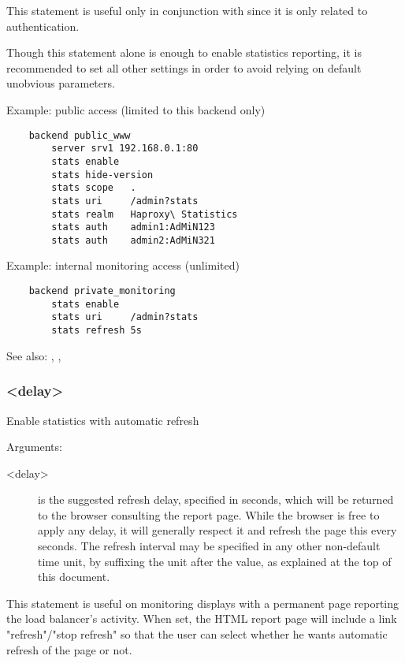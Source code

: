   This statement is useful only in conjunction with  since it is
  only related to authentication.

  Though this statement alone is enough to enable statistics reporting, it is
  recommended to set all other settings in order to avoid relying on default
  unobvious parameters.

  Example: public access (limited to this backend only)
  \begin{verbatim}
    backend public_www
        server srv1 192.168.0.1:80
        stats enable
        stats hide-version
        stats scope   .
        stats uri     /admin?stats
        stats realm   Haproxy\ Statistics
        stats auth    admin1:AdMiN123
        stats auth    admin2:AdMiN321
   \end{verbatim}

   Example: internal monitoring access (unlimited)
   \begin{verbatim}
    backend private_monitoring
        stats enable
        stats uri     /admin?stats
        stats refresh 5s
   \end{verbatim}


See also: , , 

\subsubsection[stats refresh]{ <delay>}

  Enable statistics with automatic refresh


  Arguments:
  \begin{description}
  \item[<delay>] is the suggested refresh delay, specified in seconds, which will
              be returned to the browser consulting the report page. While the
              browser is free to apply any delay, it will generally respect it
              and refresh the page this every seconds. The refresh interval may
              be specified in any other non-default time unit, by suffixing the
              unit after the value, as explained at the top of this document.
  \end{description}

  This statement is useful on monitoring displays with a permanent page
  reporting the load balancer's activity. When set, the HTML report page will
  include a link "refresh"/"stop refresh" so that the user can select whether
  he wants automatic refresh of the page or not.

